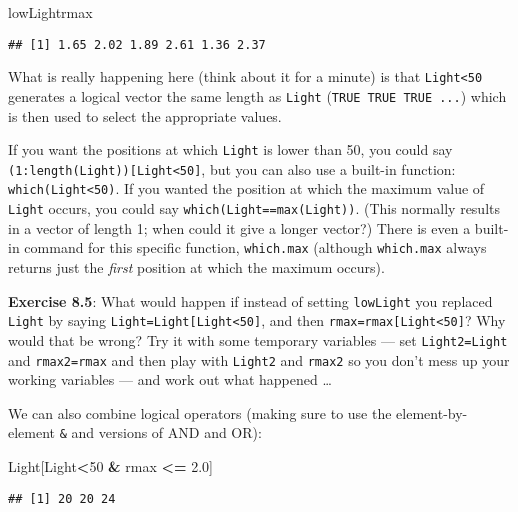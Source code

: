 \documentclass[11pt,]{article}
\newenvironment{Shaded}{\begin{snugshade}}{\end{snugshade}}
\newcommand{\DecValTok}[1]{\textcolor[rgb]{0.00,0.00,0.81}{#1}}
\newcommand{\FloatTok}[1]{\textcolor[rgb]{0.00,0.00,0.81}{#1}}
\newcommand{\StringTok}[1]{\textcolor[rgb]{0.31,0.60,0.02}{#1}}
\newcommand{\OperatorTok}[1]{\textcolor[rgb]{0.81,0.36,0.00}{\textbf{#1}}}
\newcommand{\NormalTok}[1]{#1}
\begin{document}
\begin{Shaded}
\begin{Highlighting}[]
\NormalTok{lowLightrmax}
\end{Highlighting}
\end{Shaded}

\begin{verbatim}
## [1] 1.65 2.02 1.89 2.61 1.36 2.37
\end{verbatim}

What is really happening here (think about it for a minute) is that
\texttt{Light\textless{}50} generates a logical vector the same length
as \texttt{Light} (\texttt{TRUE\ TRUE\ TRUE\ ...}) which is then used to
select the appropriate values.

If you want the positions at which \texttt{Light} is lower than 50, you
could say \texttt{(1:length(Light)){[}Light\textless{}50{]}}, but you
can also use a built-in function: \texttt{which(Light\textless{}50)}. If
you wanted the position at which the maximum value of \texttt{Light}
occurs, you could say \texttt{which(Light==max(Light))}. (This normally
results in a vector of length 1; when could it give a longer vector?)
There is even a built-in command for this specific function,
\texttt{which.max} (although \texttt{which.max} always returns just the
\emph{first} position at which the maximum occurs).

\textbf{Exercise 8.5}: What would happen if instead of setting
\texttt{lowLight} you replaced \texttt{Light} by saying
\texttt{Light=Light{[}Light\textless{}50{]}}, and then
\texttt{rmax=rmax{[}Light\textless{}50{]}}? Why would that be wrong? Try
it with some temporary variables --- set \texttt{Light2=Light} and
\texttt{rmax2=rmax} and then play with \texttt{Light2} and
\texttt{rmax2} so you don't mess up your working variables --- and work
out what happened \ldots{}

We can also combine logical operators (making sure to use the
element-by-element \texttt{\&} and \texttt{\textbar{}} versions of AND
and OR):

\begin{Shaded}
\begin{Highlighting}[]
\NormalTok{Light[Light}\OperatorTok{<}\DecValTok{50} \OperatorTok{&}\StringTok{ }\NormalTok{rmax }\OperatorTok{<=}\StringTok{ }\FloatTok{2.0}\NormalTok{]}
\end{Highlighting}
\end{Shaded}

\begin{verbatim}
## [1] 20 20 24
\end{verbatim}
\end{document}
